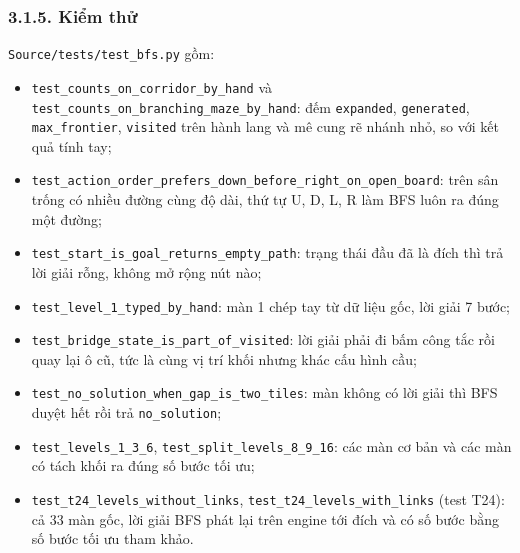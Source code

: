 \subsubsection{3.1.5. Kiểm thử}

\texttt{Source/\allowbreak{}tests/\allowbreak{}test\_\allowbreak{}bfs.\allowbreak{}py} gồm:

\begin{itemize}
\tightlist
\item
  \texttt{test\_\allowbreak{}counts\_\allowbreak{}on\_\allowbreak{}corridor\_\allowbreak{}by\_\allowbreak{}hand} và \texttt{test\_\allowbreak{}counts\_\allowbreak{}on\_\allowbreak{}branching\_\allowbreak{}maze\_\allowbreak{}by\_\allowbreak{}hand}: đếm \texttt{expanded}, \texttt{generated}, \texttt{max\_\allowbreak{}frontier}, \texttt{visited} trên hành lang và mê cung rẽ nhánh nhỏ, so với kết quả tính tay;
\item
  \texttt{test\_\allowbreak{}action\_\allowbreak{}order\_\allowbreak{}prefers\_\allowbreak{}down\_\allowbreak{}before\_\allowbreak{}right\_\allowbreak{}on\_\allowbreak{}open\_\allowbreak{}board}: trên sân trống có nhiều đường cùng độ dài, thứ tự U, D, L, R làm BFS luôn ra đúng một đường;
\item
  \texttt{test\_\allowbreak{}start\_\allowbreak{}is\_\allowbreak{}goal\_\allowbreak{}returns\_\allowbreak{}empty\_\allowbreak{}path}: trạng thái đầu đã là đích thì trả lời giải rỗng, không mở rộng nút nào;
\item
  \texttt{test\_\allowbreak{}level\_\allowbreak{}1\_\allowbreak{}typed\_\allowbreak{}by\_\allowbreak{}hand}: màn 1 chép tay từ dữ liệu gốc, lời giải 7 bước;
\item
  \texttt{test\_\allowbreak{}bridge\_\allowbreak{}state\_\allowbreak{}is\_\allowbreak{}part\_\allowbreak{}of\_\allowbreak{}visited}: lời giải phải đi bấm công tắc rồi quay lại ô cũ, tức là cùng vị trí khối nhưng khác cấu hình cầu;
\item
  \texttt{test\_\allowbreak{}no\_\allowbreak{}solution\_\allowbreak{}when\_\allowbreak{}gap\_\allowbreak{}is\_\allowbreak{}two\_\allowbreak{}tiles}: màn không có lời giải thì BFS duyệt hết rồi trả \texttt{no\_\allowbreak{}solution};
\item
  \texttt{test\_\allowbreak{}levels\_\allowbreak{}1\_\allowbreak{}3\_\allowbreak{}6}, \texttt{test\_\allowbreak{}split\_\allowbreak{}levels\_\allowbreak{}8\_\allowbreak{}9\_\allowbreak{}16}: các màn cơ bản và các màn có tách khối ra đúng số bước tối ưu;
\item
  \texttt{test\_\allowbreak{}t24\_\allowbreak{}levels\_\allowbreak{}without\_\allowbreak{}links}, \texttt{test\_\allowbreak{}t24\_\allowbreak{}levels\_\allowbreak{}with\_\allowbreak{}links} (test T24): cả 33 màn gốc, lời giải BFS phát lại trên engine tới đích và có số bước bằng số bước tối ưu tham khảo.
\end{itemize}
